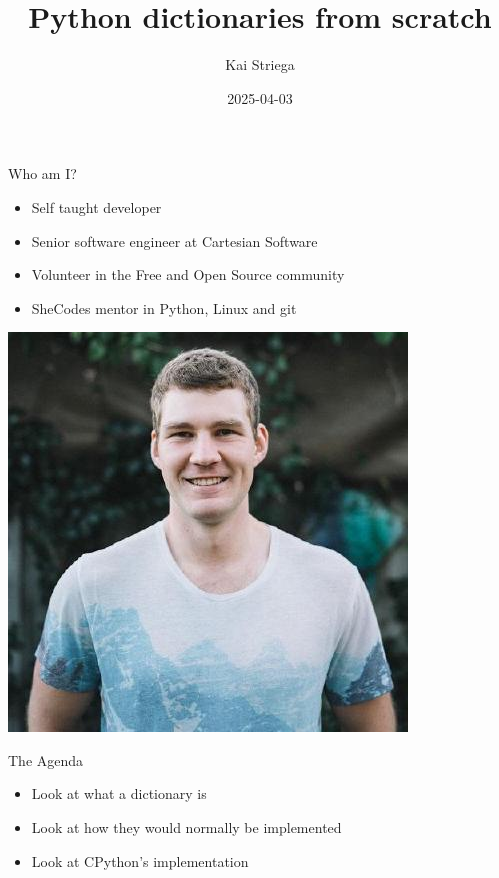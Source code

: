 \documentclass[12pt, aspectration=1610]{beamer}
\title{Python dictionaries from scratch}
\author{Kai Striega}
\date{2025-04-03}
\begin{document}
    \maketitle

    \begin{frame}{Who am I?}
        \begin{itemize}
            \item Self taught developer
            \item Senior software engineer at Cartesian Software 
            \item Volunteer in the Free and Open Source community
            \item SheCodes mentor in Python, Linux and git
        \end{itemize}
        \begin{center}
            \includegraphics[scale=0.2]{ images/headshot.jpg}
        \end{center}
    \end{frame}

    \begin{frame}{The Agenda}
        \begin{itemize}
            \item Look at what a dictionary is
            \item Look at how they would normally be implemented
            \item Look at CPython's implementation
        \end{itemize}
    \end{frame}
\end{document}
